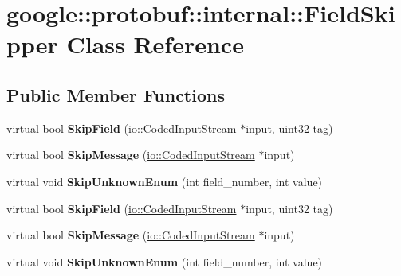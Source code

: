 \hypertarget{classgoogle_1_1protobuf_1_1internal_1_1FieldSkipper}{}\section{google\+:\+:protobuf\+:\+:internal\+:\+:Field\+Skipper Class Reference}
\label{classgoogle_1_1protobuf_1_1internal_1_1FieldSkipper}
\subsection*{Public Member Functions}
\begin{DoxyCompactItemize}
\item 
\mbox{\label{classgoogle_1_1protobuf_1_1internal_1_1FieldSkipper_a49baf196f9c5412377d93ffda4d9889e}} 
virtual bool {\bfseries Skip\+Field} (\hyperlink{classgoogle_1_1protobuf_1_1io_1_1CodedInputStream}{io\+::\+Coded\+Input\+Stream} $\ast$input, uint32 tag)
\item 
\mbox{\label{classgoogle_1_1protobuf_1_1internal_1_1FieldSkipper_ad0360759c55d3ea7c12892119e74ede0}} 
virtual bool {\bfseries Skip\+Message} (\hyperlink{classgoogle_1_1protobuf_1_1io_1_1CodedInputStream}{io\+::\+Coded\+Input\+Stream} $\ast$input)
\item 
\mbox{\label{classgoogle_1_1protobuf_1_1internal_1_1FieldSkipper_a2dd604a7007ec3c0fa9bc08a380115a5}} 
virtual void {\bfseries Skip\+Unknown\+Enum} (int field\+\_\+number, int value)
\item 
\mbox{\label{classgoogle_1_1protobuf_1_1internal_1_1FieldSkipper_a3ff6e4b790c00e8fc58d80ca899910c9}} 
virtual bool {\bfseries Skip\+Field} (\hyperlink{classgoogle_1_1protobuf_1_1io_1_1CodedInputStream}{io\+::\+Coded\+Input\+Stream} $\ast$input, uint32 tag)
\item 
\mbox{\label{classgoogle_1_1protobuf_1_1internal_1_1FieldSkipper_a3419593d6200ee337d4c418161aa8425}} 
virtual bool {\bfseries Skip\+Message} (\hyperlink{classgoogle_1_1protobuf_1_1io_1_1CodedInputStream}{io\+::\+Coded\+Input\+Stream} $\ast$input)
\item 
\mbox{\label{classgoogle_1_1protobuf_1_1internal_1_1FieldSkipper_a3ac0e12fdc9b298b1fa82967be0dbcee}} 
virtual void {\bfseries Skip\+Unknown\+Enum} (int field\+\_\+number, int value)
\end{DoxyCompactItemize}


